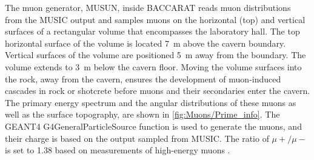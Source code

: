 The muon generator, MUSUN, inside BACCARAT reads muon distributions from the MUSIC output and samples muons on the horizontal (top) and vertical surfaces of a rectangular volume that encompasses the laboratory hall. The top horizontal surface of the volume is located 7~m above the cavern boundary. Vertical surfaces of the volume are positioned 5~m away from the boundary. The volume extends to 3~m below the cavern floor. Moving the volume surfaces into the rock, away from the cavern, ensures the development of muon-induced cascades in rock or shotcrete before muons and their secondaries enter the cavern. The primary energy spectrum and the angular distributions of these muons as well as the surface topography, are shown in \autoref{fig:Muons/Prime_info}. The GEANT4 {\selectfont G4GeneralParticleSource} function is used to generate the muons, and their charge is based on the output sampled from MUSIC. The ratio of $\mu+/\mu-$ is set to 1.38 based on measurements of high-energy muons \cite{Ashley:1975uj}.
